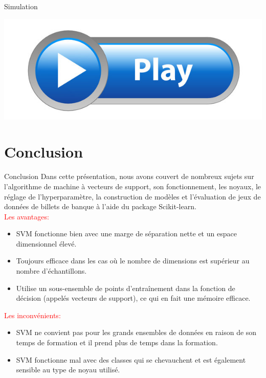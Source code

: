\documentclass{bredelebeamer}
\begin{document}
   \begin{frame}{Simulation}
   
   \vfill
\begin{center}  \includegraphics[scale=0.25]{28.jpg} \end{center}
\vfill
 
   \end{frame}
 \section{Conclusion}

   \begin{frame}{Conclusion}
Dans cette présentation, nous avons couvert de nombreux sujets sur l'algorithme de machine à vecteurs de support, son fonctionnement, les noyaux, le réglage de l'hyperparamètre, la construction de modèles et l'évaluation de jeux de données de billets de banque à l'aide du package Scikit-learn.\vspace{1\baselineskip}\\
  \textcolor{red}{Les avantages:}
  \begin{itemize} 
   \item SVM fonctionne bien avec une marge de séparation nette et un espace dimensionnel élevé.\\
      \item Toujours efficace dans les cas où le nombre de dimensions est supérieur au nombre d'échantillons.\\
      \item Utilise un sous-ensemble de points d’entraînement dans la fonction de décision (appelés vecteurs de support), ce qui en fait une mémoire efficace.\vspace{1\baselineskip}\\
      \end{itemize}
      
    \textcolor{red}{Les inconvénients:} 
    \begin{itemize} 
   \item SVM ne convient pas pour les grands ensembles de données en raison de son temps de formation et il prend plus de temps dans la formation.\\
   \item SVM fonctionne mal avec des classes qui se chevauchent et est également sensible au type de noyau utilisé.\\

  
  
  
 \end{itemize}
  \end{frame}
  
\end{document}
